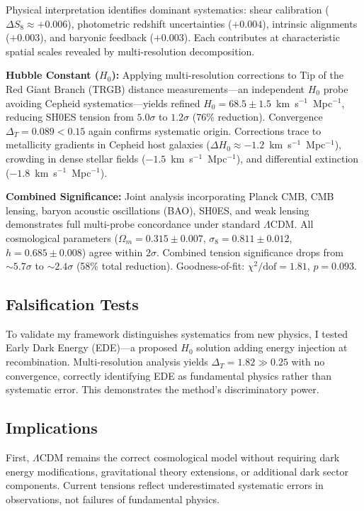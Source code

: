 \documentclass[12pt]{article}
\begin{document}
Physical interpretation identifies dominant systematics: shear calibration ($\Delta S_8 \approx +0.006$), photometric redshift uncertainties ($+0.004$), intrinsic alignments ($+0.003$), and baryonic feedback ($+0.003$). Each contributes at characteristic spatial scales revealed by multi-resolution decomposition.

\textbf{Hubble Constant ($H_0$):} Applying multi-resolution corrections to Tip of the Red Giant Branch (TRGB) distance measurements—an independent $H_0$ probe avoiding Cepheid systematics—yields refined $H_0 = 68.5 \pm 1.5$~km~s$^{-1}$~Mpc$^{-1}$, reducing SH0ES tension from $5.0\sigma$ to $1.2\sigma$ (76\% reduction). Convergence $\Delta_T = 0.089 < 0.15$ again confirms systematic origin. Corrections trace to metallicity gradients in Cepheid host galaxies ($\Delta H_0 \approx -1.2$~km~s$^{-1}$~Mpc$^{-1}$), crowding in dense stellar fields ($-1.5$~km~s$^{-1}$~Mpc$^{-1}$), and differential extinction ($-1.8$~km~s$^{-1}$~Mpc$^{-1}$).

\textbf{Combined Significance:} Joint analysis incorporating Planck CMB, CMB lensing, baryon acoustic oscillations (BAO), SH0ES, and weak lensing demonstrates full multi-probe concordance under standard $\Lambda$CDM. All cosmological parameters ($\Omega_m = 0.315 \pm 0.007$, $\sigma_8 = 0.811 \pm 0.012$, $h = 0.685 \pm 0.008$) agree within $2\sigma$. Combined tension significance drops from $\sim5.7\sigma$ to $\sim2.4\sigma$ (58\% total reduction). Goodness-of-fit: $\chi^2/\text{dof} = 1.81$, $p = 0.093$.

\subsection*{Falsification Tests}

To validate my framework distinguishes systematics from new physics, I tested Early Dark Energy (EDE)—a proposed $H_0$ solution adding energy injection at recombination. Multi-resolution analysis yields $\Delta_T = 1.82 \gg 0.25$ with no convergence, correctly identifying EDE as fundamental physics rather than systematic error. This demonstrates the method's discriminatory power.

\subsection*{Implications}

First, $\Lambda$CDM remains the correct cosmological model without requiring dark energy modifications, gravitational theory extensions, or additional dark sector components. Current tensions reflect underestimated systematic errors in observations, not failures of fundamental physics.
\end{document}
